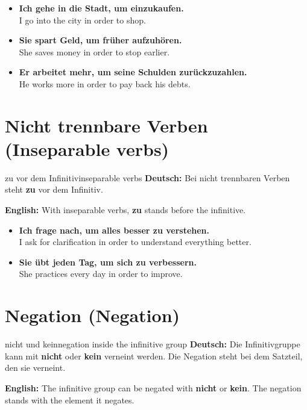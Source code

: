 \documentclass[a4paper,11pt]{article}
\newcommand{\GermanText}[1]{\textbf{Deutsch: }#1\par}
\newcommand{\EnglishText}[1]{{\small\color{SoftGray}\textbf{English: }#1\par}}
\newcommand{\ExampleItem}[2]{\item \textbf{#1}\\{\small\color{SoftGray}#2}}
\begin{document}
        \begin{exbox}
            \begin{itemize}
                \ExampleItem{Ich gehe in die Stadt, um einzukaufen.}{I go into the city in order to shop.}
                \ExampleItem{Sie spart Geld, um früher aufzuhören.}{She saves money in order to stop earlier.}
                \ExampleItem{Er arbeitet mehr, um seine Schulden zurückzuzahlen.}{He works more in order to pay back his debts.}
            \end{itemize}
        \end{exbox}


    \section{Nicht trennbare Verben \textnormal{(Inseparable verbs)}}

        \begin{grammarentry}{zu vor dem Infinitiv}{inseparable verbs}
            \GermanText{Bei nicht trennbaren Verben steht \textbf{zu} vor dem Infinitiv.}
            \EnglishText{With inseparable verbs, \textbf{zu} stands before the infinitive.}
        \end{grammarentry}

        \begin{exbox}
            \begin{itemize}
                \ExampleItem{Ich frage nach, um alles besser zu verstehen.}{I ask for clarification in order to understand everything better.}
                \ExampleItem{Sie übt jeden Tag, um sich zu verbessern.}{She practices every day in order to improve.}
            \end{itemize}
        \end{exbox}


    \section{Negation \textnormal{(Negation)}}

        \begin{grammarentry}{nicht und kein}{negation inside the infinitive group}
            \GermanText{Die Infinitivgruppe kann mit \textbf{nicht} oder \textbf{kein} verneint werden. Die Negation steht bei dem Satzteil, den sie verneint.}
            \EnglishText{The infinitive group can be negated with \textbf{nicht} or \textbf{kein}. The negation stands with the element it negates.}
        \end{grammarentry}
\end{document}
